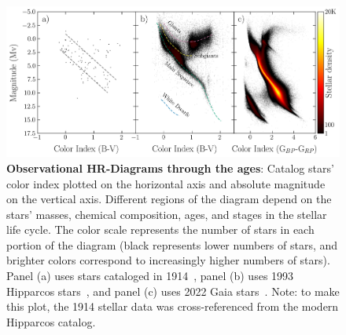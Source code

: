 \begin{figure}
\begin{center}
  \centerline{\includegraphics[width=1.2\linewidth]{figures/hr_diagram.png}}
  \caption{\textbf{Observational HR-Diagrams through the ages}: Catalog stars' color index plotted on the horizontal axis and absolute magnitude on the vertical axis. Different regions of the diagram depend on the stars' masses, chemical composition, ages, and stages in the stellar life cycle. The color scale represents the number of stars in each portion of the diagram (black represents lower numbers of stars, and brighter colors correspond to increasingly higher numbers of stars). Panel (a) uses stars cataloged in 1914~\cite{Russell:1914:PA, 1914_HR_data}, panel (b) uses 1993 Hipparcos stars~\cite{HIPPARCOS}, and panel (c) uses 2022 Gaia stars~\cite{GaiaMission, GaiaEDR3}. Note: to make this plot, the 1914 stellar data was cross-referenced from the modern Hipparcos catalog.
 }
  \label{fig:HR-diagrams}
\end{center}
\end{figure}


